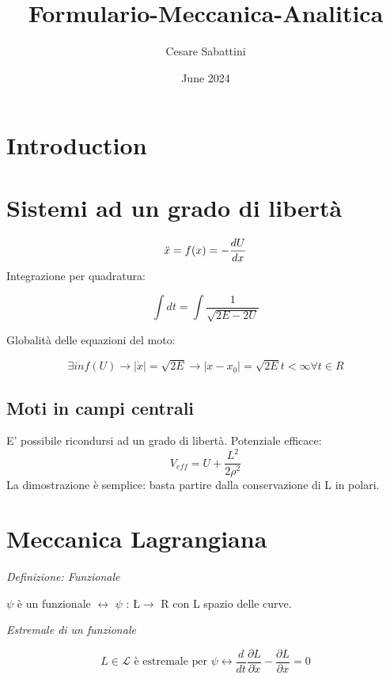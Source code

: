\documentclass{article}
\title{Formulario-Meccanica-Analitica}
\author{Cesare Sabattini}
\date{June 2024}
\begin{document}
\maketitle

\section{Introduction}

\section{Sistemi ad un grado di libertà}

\begin{equation}
    \Ddot{x}=f(x)=-\frac{dU}{dx}
\end{equation}
Integrazione per quadratura:

\begin{equation}
    \int dt = \int \frac{1}{\sqrt{2E-2U}}
\end{equation}

Globalità delle equazioni del moto:

\begin{equation}
    \exists inf(U) \rightarrow |\dot x|=\sqrt{2E} \rightarrow |x-x_0|=\sqrt{2E}t<\infty \forall t \in R
\end{equation}

\subsection{Moti in campi centrali}
E' possibile ricondursi ad un grado di libertà.
Potenziale efficace:
\begin{equation}
    V_{eff}=U+\frac{L^2}{2\rho^2}
\end{equation}
La dimostrazione è semplice: basta partire dalla conservazione di L in polari.

\section{Meccanica Lagrangiana}

\textit{Definizione: Funzionale}

$\psi$ è un funzionale $\leftrightarrow$ $\psi$ : \L $\rightarrow$ R
con L spazio delle curve.

\textit{Estremale di un funzionale}

\begin{equation}
    L \in \mathcal{L} \text{ è estremale per } \psi \leftrightarrow \frac{d}{dt} \frac{\partial L}{\partial \dot{x}} - \frac{\partial L}{\partial x} = 0
\end{equation}
\end{document}
